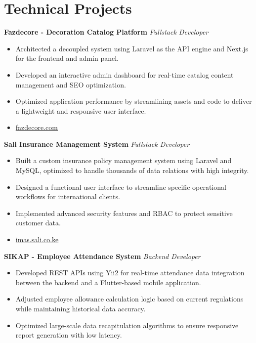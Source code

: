 \documentclass[11pt,a4paper]{article}
\begin{document}
\section*{Technical Projects}

\textbf{Fazdecore - Decoration Catalog Platform} \hfill \textit{Fullstack Developer}
\begin{itemize}
    \item Architected a decoupled system using Laravel as the API engine and Next.js for the frontend and admin panel.
    \item Developed an interactive admin dashboard for real-time catalog content management and SEO optimization.
    \item Optimized application performance by streamlining assets and code to deliver a lightweight and responsive user interface.
    \item \href{https://fazdecore.com/}{fazdecore.com}
\end{itemize}

\textbf{Sali Insurance Management System} \hfill \textit{Fullstack Developer}
\begin{itemize}
    \item Built a custom insurance policy management system using Laravel and MySQL, optimized to handle thousands of data relations with high integrity.
    \item Designed a functional user interface to streamline specific operational workflows for international clients.
    \item Implemented advanced security features and RBAC to protect sensitive customer data.
    \item \href{https://imas.sali.co.ke/}{imas.sali.co.ke}
\end{itemize}

\textbf{SIKAP - Employee Attendance System} \hfill \textit{Backend Developer}
\begin{itemize}
    \item Developed REST APIs using Yii2 for real-time attendance data integration between the backend and a Flutter-based mobile application.
    \item Adjusted employee allowance calculation logic based on current regulations while maintaining historical data accuracy.
    \item Optimized large-scale data recapitulation algorithms to ensure responsive report generation with low latency.
\end{itemize}
\end{document}
